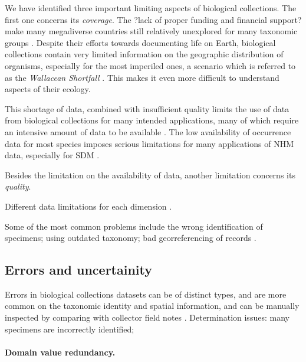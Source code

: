 We have identified three important limiting aspects of biological collections. %
The first one concerns its \textit{coverage}. 
The ?lack of proper funding and financial support? make many megadiverse countries still relatively unexplored for many taxonomic groups \cite{Soberon2004}.
Despite their efforts towards documenting life on Earth, biological collections contain very limited information on the geographic distribution of organisms, especially for the most imperiled ones, a scenario which is referred to as the \textit{Wallacean Shortfall} \cite{Lomolino2004}.
This makes it even more difficult to understand aspects of their ecology.



This shortage of data, combined with insufficient quality limits the use of data from biological collections for many intended applications, many of which require an intensive amount of data to be available \cite{Guisan2007}.
The low availability of occurrence data for most species imposes serious limitations for many applications of NHM data, especially for SDM \cite{Galante2017}.


Besides the limitation on the availability of data, another limitation concerns its \textit{quality}.

Different data limitations for each dimension \cite{Meyer2016}.

Some of the most common problems include the wrong identification of specimens; using outdated taxonomy; bad georreferencing of records \cite{Soberon2004}.




\subsection{Errors and uncertainity}
Errors in biological collections datasets can be of distinct types, and are more common on the taxonomic identity and spatial information, and can be manually inspected by comparing with collector field notes \cite{Graham2004}.
Determination issues: many specimens are incorrectly identified;



\paragraph*{Domain value redundancy.}

